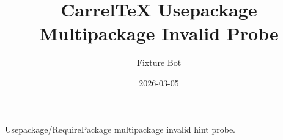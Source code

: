 \documentclass{article}
\title{CarrelTeX Usepackage Multipackage Invalid Probe}
\author{Fixture Bot}
\date{2026-03-05}
\begin{document}
\maketitle

Usepackage/RequirePackage multipackage invalid hint probe.
\end{document}
